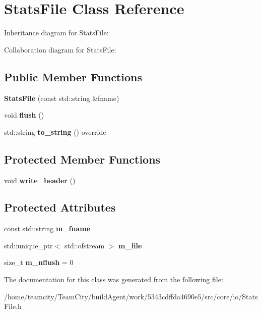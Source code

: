 \hypertarget{classStatsFile}{}\section{Stats\+File Class Reference}
\label{classStatsFile}


Inheritance diagram for Stats\+File\+:


Collaboration diagram for Stats\+File\+:
\subsection*{Public Member Functions}
\begin{DoxyCompactItemize}
\item 
{\bfseries Stats\+File} (const std\+::string \&fname)\hypertarget{classStatsFile_aa62b000b927c9b48008459a9fed54653}{}\label{classStatsFile_aa62b000b927c9b48008459a9fed54653}

\item 
void {\bfseries flush} ()\hypertarget{classStatsFile_a9a96925c18c782acb1dab5a253f9f797}{}\label{classStatsFile_a9a96925c18c782acb1dab5a253f9f797}

\item 
std\+::string {\bfseries to\+\_\+string} () override\hypertarget{classStatsFile_a9021f3caf32ea41ded764595d66057c5}{}\label{classStatsFile_a9021f3caf32ea41ded764595d66057c5}

\end{DoxyCompactItemize}
\subsection*{Protected Member Functions}
\begin{DoxyCompactItemize}
\item 
void {\bfseries write\+\_\+header} ()\hypertarget{classStatsFile_a473d92c3e70b3d7d7bd469ed5eec42c7}{}\label{classStatsFile_a473d92c3e70b3d7d7bd469ed5eec42c7}

\end{DoxyCompactItemize}
\subsection*{Protected Attributes}
\begin{DoxyCompactItemize}
\item 
const std\+::string {\bfseries m\+\_\+fname}\hypertarget{classStatsFile_aa995dd14cb1160e8a866880ce1ce7e9b}{}\label{classStatsFile_aa995dd14cb1160e8a866880ce1ce7e9b}

\item 
std\+::unique\+\_\+ptr$<$ std\+::ofstream $>$ {\bfseries m\+\_\+file}\hypertarget{classStatsFile_abaa201792069bcaba74750e7a0ba8e5b}{}\label{classStatsFile_abaa201792069bcaba74750e7a0ba8e5b}

\item 
size\+\_\+t {\bfseries m\+\_\+nflush} = 0\hypertarget{classStatsFile_a054a146952fcf9a0b4f81b96fddbea9a}{}\label{classStatsFile_a054a146952fcf9a0b4f81b96fddbea9a}

\end{DoxyCompactItemize}


The documentation for this class was generated from the following file\+:\begin{DoxyCompactItemize}
\item 
/home/teamcity/\+Team\+City/build\+Agent/work/5343cdffda4690e5/src/core/io/Stats\+File.\+h\end{DoxyCompactItemize}
